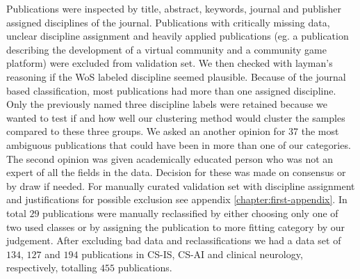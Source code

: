 Publications were inspected by title, abstract, keywords, journal
and publisher assigned disciplines of the journal. Publications
with critically missing data, unclear discipline assignment and
heavily applied publications (eg. a publication describing the 
development of a virtual community and a community game platform)
were excluded from validation set. 
We then checked with layman's reasoning if the WoS labeled 
discipline seemed plausible. Because of the journal based 
classification, most publications had more than one assigned 
discipline. Only the previously named three discipline labels were 
retained because we wanted to test if and how well our clustering 
method would cluster the samples compared to these three 
groups. We asked an another opinion for 37 the most ambiguous 
publications that could have been in more than one of our 
categories. The second opinion was given academically educated 
person who was not an expert of all the fields in the data. 
Decision for these was made on consensus or by draw if needed.
For manually curated
validation set with discipline assignment and justifications for
possible exclusion see appendix \ref{chapter:first-appendix}.
In total $29$ publications were manually reclassified by either
choosing only one of two used classes or by assigning the 
publication to more fitting category by our judgement. After
excluding bad data and reclassifications we had a data set of 
$134$, $127$ and $194$ publications in CS-IS, CS-AI and clinical
neurology, respectively, totalling $455$ publications.

